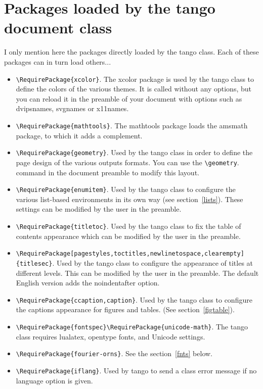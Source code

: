 \documentclass[english,ColorTheme=Red,FontSize=10pt]{tango}
\newcommand\TO[1]{\textsf{#1}}
\begin{document}

\section{Packages loaded by the tango document class}
I only mention here the packages directly loaded by the tango class. Each of these packages can in turn load others...
\begin{itemize}
\item \verb=\RequirePackage{xcolor}=. The \TO{xcolor} package is used by the tango class to define the colors of the various themes.  It is called without any options, but you can reload it in the preamble of your document with options such as \TO{dvipsnames}, \TO{svgnames} or \TO{x11names}.
\item\verb=\RequirePackage{mathtools}=. The \TO{mathtools} package loads the \TO{amsmath} package, to which it adds a complement.
\item\verb=\RequirePackage{geometry}=. Used by the tango class in order to define the page design of the various outputs formats. You can use the \verb=\geometry=. command in the document preamble to modify this layout.
\item\verb=\RequirePackage{enumitem}=. Used by the tango class to configure the various \TO{list}-based environments in its own way (see section~\ref{lists}). These settings can be modified by the user in the preamble.
\item\verb=\RequirePackage{titletoc}=. Used by the tango class to fix the table of contents appearance which can be modified by the user in the preamble.
\item\verb=\RequirePackage[pagestyles,toctitles,newlinetospace,clearempty]{titlesec}=. Used by the tango class to configure the appearance of titles at different levels.  This can be modified by the user in the preamble. The default English version adds the \TO{noindentafter} option.
\item\verb=\RequirePackage{ccaption,caption}=. Used by the tango class to configure the captions appearance for figures and tables. (See section~\ref{figtable}).
\item\verb=\RequirePackage{fontspec}\RequirePackage{unicode-math}=. The tango class requires \TO{lualatex}, opentype fonts, and Unicode settings. 
\item\verb=\RequirePackage{fourier-orns}=. See the section~\ref{fnts} below.
\item\verb=\RequirePackage{iflang}=. Used by tango to send a class error message if no language option is given. 

\end{itemize}
\end{document}
